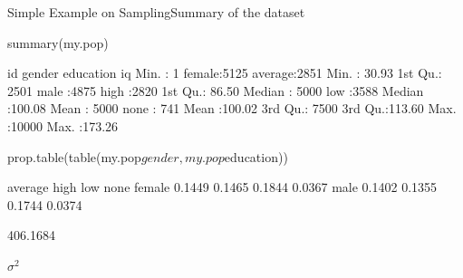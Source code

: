 \documentclass[11pt,german,hideothersubsections]{beamer}
\begin{document}
\begin{frame}[fragile]{Simple Example on Sampling}{Summary of the dataset}
\begin{footnotesize}
\begin{Schunk}
\begin{Sinput}
 summary(my.pop)
\end{Sinput}
\begin{Soutput}
       id           gender       education          iq        
 Min.   :    1   female:5125   average:2851   Min.   : 30.93  
 1st Qu.: 2501   male  :4875   high   :2820   1st Qu.: 86.50  
 Median : 5000                 low    :3588   Median :100.08  
 Mean   : 5000                 none   : 741   Mean   :100.02  
 3rd Qu.: 7500                                3rd Qu.:113.60  
 Max.   :10000                                Max.   :173.26  
\end{Soutput}
\begin{Sinput}
 prop.table(table(my.pop$gender,my.pop$education))
\end{Sinput}
\begin{Soutput}
         average   high    low   none
  female  0.1449 0.1465 0.1844 0.0367
  male    0.1402 0.1355 0.1744 0.0374
\end{Soutput}
\begin{Soutput}
[1] 406.1684
\end{Soutput}
\end{Schunk}
\begin{itemize}\footnotesize{
\item[$\Rightarrow$]$\sigma^2$}
\end{itemize}
\end{footnotesize}
\end{frame}
\end{document}
